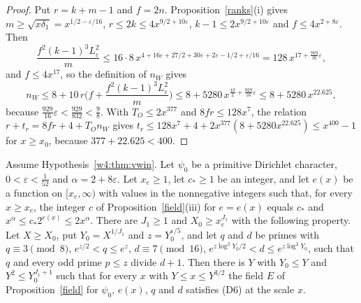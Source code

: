 \begin{proof}
Put $r=k+m-1$ and $f=2n$. Proposition~\ref{ranks}(i) gives $m\ge\sqrt{x\delta_1}=x^{1/2-\varepsilon/16}$, $r\le2k\le4x^{9/2+10\varepsilon}$, $k-1\le2x^{9/2+10\varepsilon}$ and $f\le4x^{2+8\varepsilon}$. Then
\[
\frac{f^2(k-1)^3L_\varepsilon^2}m\le16\cdot8\,x^{4+16\varepsilon+27/2+30\varepsilon+2\varepsilon-1/2+\varepsilon/16}=128\,x^{17+\frac{769}{16}\varepsilon},
\]
and $f\le4x^{17}$, so the definition of $n_W$ gives
\[
n_W\le8+10\,r\Big(f+\frac{f^2(k-1)^3L_\varepsilon^2}m\Big)\le8+5280\,x^{\frac{43}2+\frac{929}{16}\varepsilon}\le8+5280\,x^{22.625},
\]
because $\frac{929}{16}\varepsilon<\frac{929}{832}<\frac98$. With $T_O\le2x^{377}$ and $8fr\le128x^7$, the relation $r+t_r=8fr+4+T_On_W$ gives $t_r\le128x^7+4+2x^{377}(8+5280x^{22.625})\le x^{400}-1$ for $x\ge x_0$, because $377+22.625<400$.
\end{proof}

\begin{proposition}\label{r6:R6:thm:selmer}
Assume Hypothesis~\ref{w4:thm:vwin}. Let $\psi_0$ be a primitive Dirichlet character, $0<\varepsilon<\frac1{52}$ and $\alpha=2+8\varepsilon$. Let $x_e\ge1$, let $c_\ast\ge1$ be an integer, and let $e(x)$ be a function on $[x_e,\infty)$ with values in the nonnegative integers such that, for every $x\ge x_e$, the integer $c$ of Proposition~\ref{field}(iii) for $e=e(x)$ equals $c_\ast$ and $x^\alpha\le c_\ast2^{e(x)}\le2x^\alpha$. There are $J_1\ge1$ and $X_0\ge x_e^{J_1}$ with the following property. Let $X\ge X_0$, put $Y_0=X^{1/J_1}$ and $z=Y_0^{\varepsilon/5}$, and let $q$ and $d$ be primes with $q\equiv3\pmod8$, $e^{z/2}<q\le e^z$, $d\equiv7\pmod{16}$, $e^{z\log^2Y_0/2}<d\le e^{z\log^2Y_0}$, such that $q$ and every odd prime $p\le z$ divide $d+1$. Then there is $Y$ with $Y_0\le Y$ and $Y^2\le Y_0^{J_1+1}$ such that for every $x$ with $Y\le x\le Y^{3/2}$ the field $E$ of Proposition~\ref{field} for $\psi_0$, $e(x)$, $q$ and $d$ satisfies (D6) at the scale $x$.
\end{proposition}

